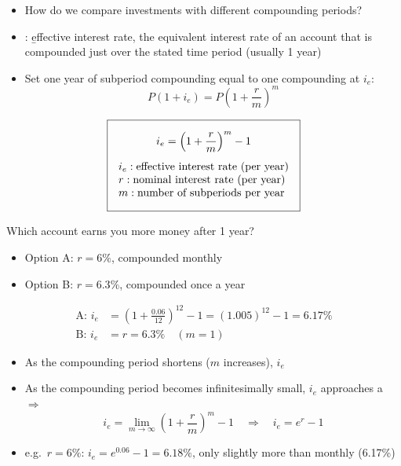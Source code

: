 \begin{itemize}
    \item How do we compare investments with different compounding periods?
    \item {}: \b{effective interest rate}, the equivalent interest rate of an account that is compounded just  over the stated time period (usually 1 year)
    \item Set one year of subperiod compounding equal to one compounding at $i_e$:
    \[P(1+i_e) = P\left(1+\frac{r}{m}\right)^m\]
\end{itemize}
\[\boxed{\begin{gathered}
    i_e = \left(1+\frac{r}{m}\right)^m - 1\\[4pt]
    \begin{array}{@{}l@{}}
        i_e: \text{effective interest rate (per year)}\\
        r: \text{nominal interest rate (per year)}\\
        m: \text{number of subperiods per year}
    \end{array}
\end{gathered}}\]

\begin{example}
    Which account earns you more money after 1 year?
    \begin{itemize}
        \item Option A: $r = 6\%$, compounded monthly
        \item Option B: $r = 6.3\%$, compounded once a year
    \end{itemize}
    \begin{align*}
        \text{A: } i_e &= \left(1+\frac{0.06}{12}\right)^{12} - 1 = (1.005)^{12} - 1 = 6.17\%\\
        \text{B: } i_e &= r = 6.3\% \quad (m = 1)
    \end{align*}
\end{example}

\begin{itemize}
    \item As the compounding period shortens ($m$ increases), $i_e$ 
    \item As the compounding period becomes infinitesimally small, $i_e$ approaches a  $\Rightarrow$ 
    \[i_e = \lim_{m\to\infty}\left(1+\frac{r}{m}\right)^m - 1 \quad\Rightarrow\quad \boxed{i_e = e^r - 1}\]
    \item e.g.\ $r = 6\%$: $i_e = e^{0.06} - 1 = 6.18\%$, only slightly more than monthly (6.17\%)
\end{itemize}

